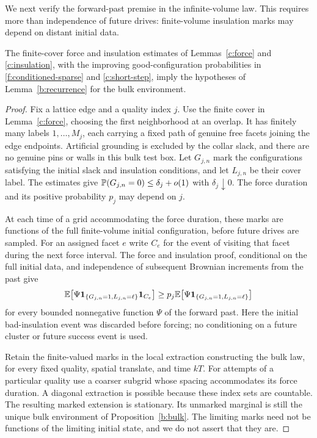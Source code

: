 We next verify the forward-past premise in the infinite-volume law.
This requires more than independence of future drives: finite-volume
insulation marks may depend on distant initial data.

\begin{lemma}
\label{b:force-transfer}
The finite-cover force and insulation estimates of
Lemmas~\ref{c:force} and \ref{c:insulation}, with the improving
good-configuration probabilities in \ref{f:conditioned-sparse} and
\eqref{c:short-step}, imply the hypotheses of
Lemma~\ref{b:recurrence} for the bulk environment.
\end{lemma}
\begin{proof}
Fix a lattice edge and a quality index $j$. Use the finite cover in
Lemma~\ref{c:force}, choosing the first neighborhood at an overlap.
It has finitely many labels $1,\ldots,M_j$, each carrying a fixed path
of genuine free facets joining the edge endpoints. Artificial grounding
is excluded by the collar slack, and there are no genuine pins or walls
in this bulk test box. Let $G_{j,n}$ mark the configurations satisfying
the initial slack and insulation conditions, and let $L_{j,n}$ be their
cover label. The estimates give
$\mathbb P(G_{j,n}=0)\le\delta_j+o(1)$ with $\delta_j\downarrow0$.
The force duration and its positive probability $p_j$ may depend on $j$.

At each time of a grid accommodating the force duration, these marks
are functions of the full finite-volume initial configuration, before
future drives are sampled. For an assigned facet $e$ write $C_e$ for
the event of visiting that facet during the next force interval.
The force and insulation proof, conditional on the full initial data,
and independence of subsequent Brownian increments from the past give
\begin{equation}\label{b:finite-force-inequality}
 \mathbb E\bigl[\Psi\mathbf1_{\{G_{j,n}=1,L_{j,n}=\ell\}}
                    \mathbf1_{C_e}\bigr]
 \ge p_j\mathbb E\bigl[\Psi\mathbf1_{\{G_{j,n}=1,L_{j,n}=\ell\}}\bigr]
\end{equation}
for every bounded nonnegative function $\Psi$ of the forward past.
Here the initial bad-insulation event was discarded before forcing;
no conditioning on a future cluster or future success event is used.

Retain the finite-valued marks in the local extraction constructing
the bulk law, for every fixed quality, spatial translate, and time $kT$.
For attempts of a particular quality use a coarser subgrid whose spacing
accommodates its force duration.
A diagonal extraction is possible because these index sets are
countable. The resulting marked extension is stationary. Its unmarked
marginal is still the unique bulk environment of
Proposition~\ref{b:bulk}. The limiting marks need not be functions of
the limiting initial state, and we do not assert that they are.


\end{proof}
